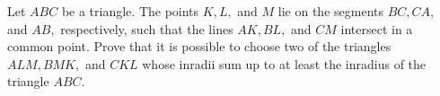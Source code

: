 Let 
$ABC$
 be a triangle. The points 
$K, L,$
 and 
$M$
 lie on the segments 
$BC, CA,$
 and 
$AB,$
 respectively, such that the lines 
$AK, BL,$
 and 
$CM$
 intersect in a common point. Prove that it is possible to choose two of the triangles 
$ALM, BMK,$
 and 
$CKL$
 whose inradii sum up to at least the inradius of the triangle 
$ABC$.


